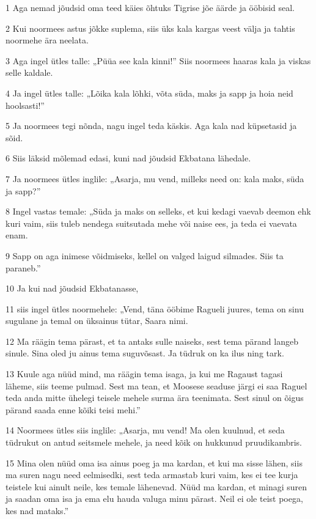 \par 1 Aga nemad jõudsid oma teed käies õhtuks Tigrise jõe äärde ja  ööbisid seal.
\par 2 Kui noormees astus jõkke suplema, siis üks kala kargas veest  välja ja tahtis noormehe ära neelata.
\par 3 Aga ingel ütles talle: „Püüa see kala kinni!” Siis noormees  haaras kala ja viskas selle kaldale.
\par 4 Ja ingel ütles talle: „Lõika kala lõhki, võta süda, maks ja  sapp ja hoia neid hoolsasti!”
\par 5 Ja noormees tegi nõnda, nagu ingel teda käskis. Aga kala nad  küpsetasid ja sõid.
\par 6 Siis läksid mõlemad edasi, kuni nad jõudsid Ekbatana lähedale.
\par 7 Ja noormees ütles inglile: „Asarja, mu vend, milleks need on:  kala maks, süda ja sapp?”
\par 8 Ingel vastas temale: „Süda ja maks on selleks, et kui kedagi  vaevab deemon ehk kuri vaim, siis tuleb nendega suitsutada mehe või  naise ees, ja teda ei vaevata enam.
\par 9 Sapp on aga inimese võidmiseks, kellel on valged laigud silmades.  Siis ta paraneb.”
\par 10 Ja kui nad jõudsid Ekbatanasse,
\par 11 siis ingel ütles noormehele: „Vend, täna ööbime Ragueli juures,  tema on sinu sugulane ja temal on üksainus tütar, Saara nimi.
\par 12 Ma räägin tema pärast, et ta antaks sulle naiseks, sest tema  pärand langeb sinule. Sina oled ju ainus tema suguvõsast. Ja tüdruk on  ka ilus ning tark.
\par 13 Kuule aga nüüd mind, ma räägin tema isaga, ja kui me Ragaust  tagasi läheme, siis teeme pulmad. Sest ma tean, et Moosese seaduse  järgi ei saa Raguel teda anda mitte ühelegi teisele mehele surma ära  teenimata. Sest sinul on õigus pärand saada enne kõiki teisi mehi.”
\par 14 Noormees ütles siis inglile: „Asarja, mu vend! Ma olen kuulnud,  et seda tüdrukut on antud seitsmele mehele, ja need kõik on hukkunud  pruudikambris.
\par 15 Mina olen nüüd oma isa ainus poeg ja ma kardan, et kui ma sisse  lähen, siis ma suren nagu need eelmisedki, sest teda armastab kuri  vaim, kes ei tee kurja teistele kui ainult neile, kes temale  lähenevad.  Nüüd ma kardan, et minagi suren ja saadan oma isa ja ema elu hauda  valuga minu pärast. Neil ei ole teist poega, kes nad mataks.”
